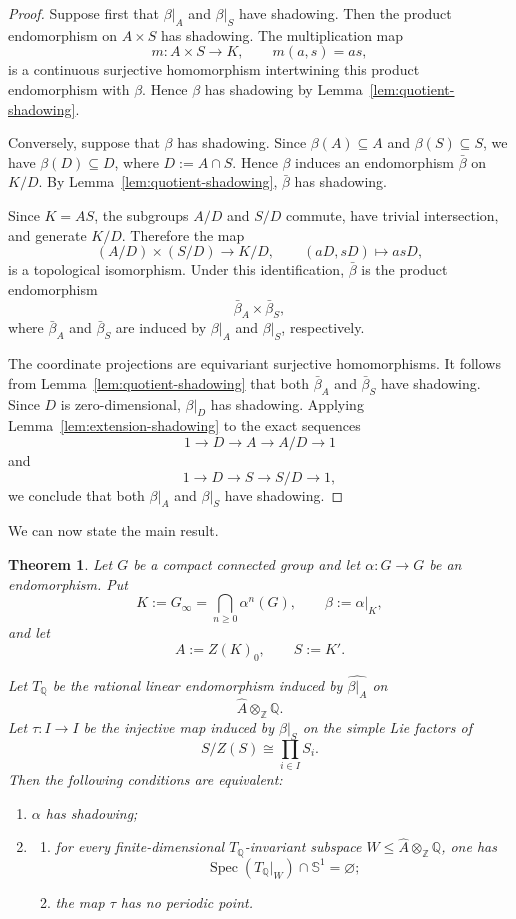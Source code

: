 \documentclass[12pt]{amsart}
\newtheorem{theorem}{Theorem}[section]
\theoremstyle{definition}
\numberwithin{equation}{section}
\theoremstyle{remark}
\begin{document}
\begin{proof}
Suppose first that $\beta|_A$ and $\beta|_S$ have shadowing. Then the
product endomorphism on $A\times S$ has shadowing. The multiplication
map
\[
m:A\times S\to K,\qquad m(a,s)=as,
\]
is a continuous surjective homomorphism intertwining this product
endomorphism with $\beta$. Hence $\beta$ has shadowing by
Lemma~\ref{lem:quotient-shadowing}.

Conversely, suppose that $\beta$ has shadowing. Since
$\beta(A)\subseteq A$ and $\beta(S)\subseteq S$, we have
$\beta(D)\subseteq D$, where $D:=A\cap S$. Hence $\beta$ induces an
endomorphism $\bar\beta$ on $K/D$. By
Lemma~\ref{lem:quotient-shadowing}, $\bar\beta$ has shadowing.

Since $K=AS$, the subgroups $A/D$ and $S/D$ commute, have trivial
intersection, and generate $K/D$. Therefore the map
\[
(A/D)\times(S/D)\longrightarrow K/D,\qquad
(aD,sD)\longmapsto asD,
\]
is a topological isomorphism. Under this identification,
$\bar\beta$ is the product endomorphism
\[
\bar\beta_A\times\bar\beta_S,
\]
where $\bar\beta_A$ and $\bar\beta_S$ are induced by $\beta|_A$ and
$\beta|_S$, respectively.

The coordinate projections are equivariant surjective homomorphisms.
It follows from Lemma~\ref{lem:quotient-shadowing} that both
$\bar\beta_A$ and $\bar\beta_S$ have shadowing. Since $D$ is
zero-dimensional, $\beta|_D$ has shadowing. Applying
Lemma~\ref{lem:extension-shadowing} to the exact sequences
\[
1\longrightarrow D\longrightarrow A\longrightarrow A/D
\longrightarrow 1
\]
and
\[
1\longrightarrow D\longrightarrow S\longrightarrow S/D
\longrightarrow 1,
\]
we conclude that both $\beta|_A$ and $\beta|_S$ have shadowing.
\end{proof}

We can now state the main result.

\begin{theorem}\label{thm:connected-endo-shad}
Let $G$ be a compact connected group and let
$\alpha:G\to G$ be an endomorphism. Put
\[
K:=G_\infty=\bigcap_{n\geq 0}\alpha^n(G),
\qquad
\beta:=\alpha|_K,
\]
and let
\[
A:=Z(K)_0,
\qquad
S:=K'.
\]

Let $T_{\mathbb Q}$ be the rational linear endomorphism induced by
$\widehat{\beta|_A}$ on
\[
\widehat A\otimes_{\mathbb Z}\mathbb Q.
\]
Let $\tau:I\to I$ be the injective map induced by $\beta|_S$ on the
simple Lie factors of
\[
S/Z(S)\cong\prod_{i\in I}S_i.
\]
Then the following conditions are equivalent:
\begin{enumerate}
\item $\alpha$ has shadowing;
\item
\begin{enumerate}
\item for every finite-dimensional $T_{\mathbb Q}$-invariant subspace
$W\leq\widehat A\otimes_{\mathbb Z}\mathbb Q$, one has
\[
\operatorname{Spec}(T_{\mathbb Q}|_W)\cap\mathbb S^1
=
\varnothing;
\]
\item the map $\tau$ has no periodic point.
\end{enumerate}
\end{enumerate}
\end{theorem}
\end{document}
